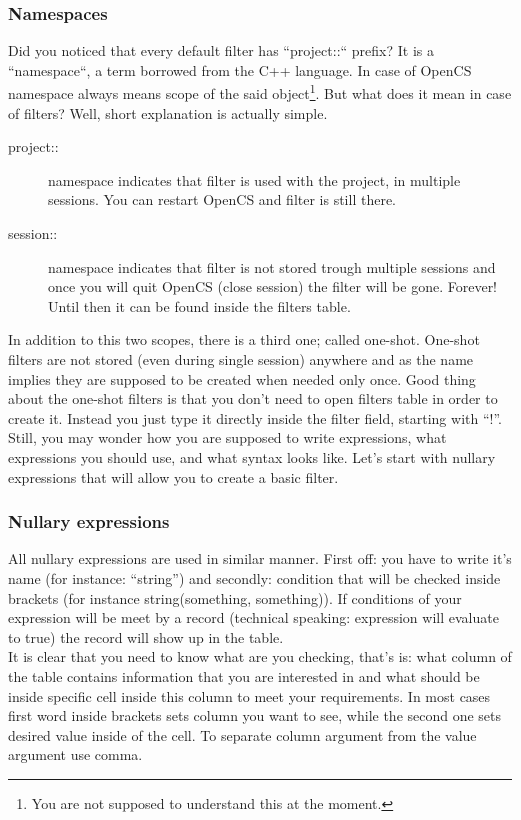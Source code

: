 \subsubsection{Namespaces}
Did you noticed that every default filter has ``project::`` prefix? It is a ``namespace``, a term borrowed from the C++ language. In case of OpenCS namespace always means scope of the said object\footnote{You are not supposed to understand this at the moment.}. But what does it mean in case of filters? Well, short explanation is actually simple.
\begin{description}
 \item[project::] namespace indicates that filter is used with the project, in multiple sessions. You can restart Open{CS} and filter is still there.
 \item[session::] namespace indicates that filter is not stored trough multiple sessions and once you will quit Open{CS} (close session) the filter will be gone. Forever! Until then it can be found inside the filters table.
\end{description}
In addition to this two scopes, there is a third one; called one-shot. One-shot filters are not stored (even during single session) anywhere and as the name implies they are supposed to be created when needed only once. Good thing about the one-shot filters is that you don't need to open filters table in order to create it. Instead you just type it directly inside the filter field, starting with ``!''.\\
Still, you may wonder how you are supposed to write expressions, what expressions you should use, and what syntax looks like. Let's start with nullary expressions that will allow you to create a basic filter.

\subsubsection{Nullary expressions}
All nullary expressions are used in similar manner. First off: you have to write it's name (for instance: ``string'') and secondly: condition that will be checked inside brackets (for instance string(something, something)). If conditions of your expression will be meet by a record (technical speaking: expression will evaluate to true) the record will show up in the table.\\
It is clear that you need to know what are you checking, that's is: what column of the table contains information that you are interested in and what should be inside specific cell inside this column to meet your requirements. In most cases first word inside brackets sets column you want to see, while the second one sets desired value inside of the cell. To separate column argument from the value argument use comma.  

